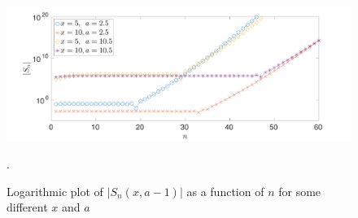 \documentclass[11pt,letter, swedish, english
]{article}
\begin{document}
\begin{figure}\centering
\centerline{ %
\includegraphics[width=1\textwidth]{Sn_a.pdf}
}
\caption{Logarithmic plot of $|S_n(x, a-1)|$ as a function of $n$
  for some different $x$ and $a$}.
\label{fig:Sn_a}
\end{figure}
\end{document}

